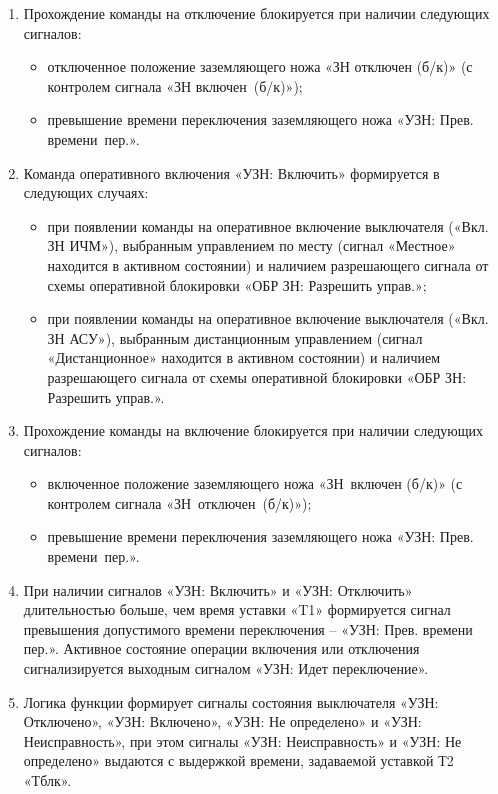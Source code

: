 \begin{enumerate}
\begin{enumerate}
\item
Прохождение команды на отключение блокируется при наличии следующих сигналов:
\begin{itemize}
	\item отключенное положение заземляющего ножа «ЗН отключен (б/к)» (с контролем сигнала «ЗН включен~(б/к)»);
	\item превышение времени переключения заземляющего ножа «УЗН: Прев. времени~пер.».
\end{itemize}

\item
Команда оперативного включения «УЗН: Включить» формируется в следующих случаях:
\begin{itemize}
	\item при появлении команды на оперативное включение выключателя («Вкл. ЗН ИЧМ»), выбранным управлением по месту (сигнал «Местное» находится в активном состоянии) и наличием разрешающего сигнала от схемы оперативной блокировки «ОБР ЗН: Разрешить управ.»;
	\item при появлении команды на оперативное включение выключателя («Вкл. ЗН АСУ»), выбранным дистанционным управлением (сигнал «Дистанционное» находится в активном состоянии) и наличием разрешающего сигнала от схемы оперативной блокировки «ОБР ЗН: Разрешить управ.».
\end{itemize}

\item
Прохождение команды на включение блокируется при наличии следующих сигналов:
\begin{itemize}
	\item включенное положение заземляющего ножа «ЗН~включен (б/к)» (с контролем сигнала «ЗН~отключен~(б/к)»);
	\item превышение времени переключения заземляющего ножа «УЗН: Прев. времени~пер.».
\end{itemize}

\item
При наличии сигналов «УЗН: Включить» и «УЗН: Отключить» длительностью больше, чем время уставки «T1» формируется сигнал превышения допустимого времени переключения -- «УЗН: Прев. времени пер.». Активное состояние операции включения или отключения сигнализируется выходным сигналом «УЗН: Идет переключение».

\item
Логика функции формирует сигналы состояния выключателя «УЗН: Отключено», «УЗН: Включено», «УЗН: Не определено» и «УЗН: Неисправность», при этом сигналы «УЗН: Неисправность» и «УЗН: Не определено» выдаются с выдержкой времени, задаваемой уставкой Т2 «Тблк».


\end{enumerate}
\end{enumerate}

